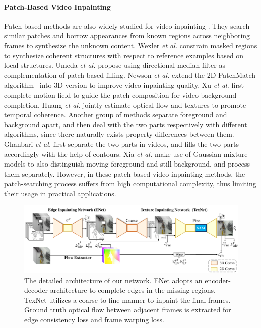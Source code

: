 \paragraph{Patch-Based Video Inpainting} Patch-based methods are also widely studied for video inpainting \cite{wexler2007space,tcsvt2009,umeda2012removal,xu2015video}. 
They search similar patches and borrow appearances from known regions across neighboring frames to synthesize the unknown content. 
Wexler \emph{et al.} \cite{wexler2007space} constrain masked regions to synthesize coherent structures with respect to reference examples based on local structures. 
Umeda \emph{et al.} \cite{umeda2012removal} propose using directional median filter as complementation of patch-based filling.
Newson \emph{et al.} \cite{newson2014video} extend the 2D PatchMatch algorithm~\cite{barnes2009patchmatch} into 3D version to improve video inpainting quality.
Xu \emph{et al.} \cite{xu2015video} first complete motion field to guide the patch composition for video background completion.
Huang \emph{et al.} \cite{huang2016temporally} jointly estimate optical flow and textures to promote temporal coherence.
%
Another group of methods separate foreground and background apart, and then deal with the two parts respectively with different algorithms, since there naturally exists property differences between them.  
Ghanbari \emph{et al.} \cite{ghanbari2011contour} first separate the two parts in videos, and fills the two parts accordingly with the help of contours.
Xia \emph{et al.} \cite{xia2011exemplar} make use of Gaussian mixture models to also distinguish moving foreground and still background, and process them separately.   
However, in these patch-based video inpainting methods, the patch-searching process suffers from high computational complexity, thus limiting their usage in practical applications.



\begin{figure}[!t]
	\centering
	\includegraphics[width=2.05\columnwidth]{sti} %
	\caption{The detailed architecture of our network. ENet adopts an encoder-decoder architecture to complete edges in the missing regions. TexNet utilizes a coarse-to-fine manner to inpaint the final frames. Ground truth optical flow between adjacent frames is extracted for edge consistency loss and frame warping loss. }
	\label{fig:stiNet}
\end{figure}

